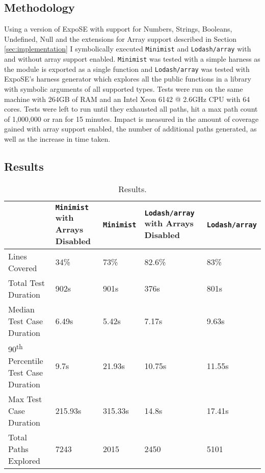\documentclass[]{final_report}
\begin{document}
\subsection{Methodology}
Using a version of ExpoSE with support for Numbers, Strings, Booleans, Undefined, Null and the extensions for Array support described in Section \ref{sec:implementation} I symbolically executed \lstinline|Minimist| and \lstinline|Lodash/array| with and without array support enabled. \lstinline|Minimist| was tested with a simple harness as the module is exported as a single function and \lstinline|Lodash/array| was tested with ExpoSE's harness generator which explores all the public functions in a library with symbolic arguments of all supported types. Tests were run on the same machine with 264GB of RAM and an Intel Xeon 6142 @ 2.6GHz CPU with 64 cores. Tests were left to run until they exhausted all paths, hit a max path count of 1,000,000 or ran for 15 minutes. Impact is measured in the amount of coverage gained with array support enabled, the number of additional paths generated, as well as the increase in time taken.

\subsection{Results}
\begin{table}[t]
\centering
\begin{tabular}{|p{4cm}|p{2cm}|p{2cm}|p{2cm}|p{2cm}|}
\hline
& \lstinline|Minimist| with Arrays Disabled & \lstinline|Minimist| & \lstinline|Lodash/array| with Arrays Disabled & \lstinline|Lodash/array| \\ \hline
Lines Covered & 34\% & 73\% & 82.6\% & 83\% \\ \hline
Total Test Duration & 902s & 901s & 376s & 801s \\ \hline
Median Test Case Duration & 6.49s & 5.42s & 7.17s & 9.63s \\ \hline
90\textsuperscript{th} Percentile Test Case Duration & 9.7s & 21.93s & 10.75s & 11.55s \\ \hline
Max Test Case Duration & 215.93s & 315.33s & 14.8s & 17.41s \\ \hline
Total Paths Explored & 7243 & 2015 & 2450 & 5101 \\ \hline
\end{tabular}
\caption{Results.}
\label{table:results}
\end{table}
\end{document}
